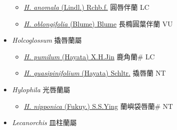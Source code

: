 \begin{itemize}
  \begin{itemize}
        \item[] \href{http://www.theplantlist.org/tpl1.1/search?q=Hetaeria+anomala}{\textit{H. anomala} (Lindl.) Rchb.f.}   圓唇伴蘭 LC
        \item[] \href{http://www.theplantlist.org/tpl1.1/search?q=Hetaeria+oblongifolia}{\textit{H. oblongifolia} (Blume) Blume}   長橢圓葉伴蘭 VU
  \end{itemize}
 \item[] \textit{Holcoglossum} 撬唇蘭屬
                    
  \begin{itemize}
        \item[] \href{http://www.theplantlist.org/tpl1.1/search?q=Holcoglossum+pumilum}{\textit{H. pumilum} (Hayata) X.H.Jin}     鹿角蘭\# LC
        \item[] \href{http://www.theplantlist.org/tpl1.1/search?q=Holcoglossum+quasipinifolium}{\textit{H. quasipinifolium} (Hayata) Schltr.}   撬唇蘭 NT
  \end{itemize}
 \item[] \textit{Hylophila} 光唇蘭屬
                    
  \begin{itemize}
        \item[] \href{http://www.theplantlist.org/tpl1.1/search?q=Hylophila+nipponica}{\textit{H. nipponica} (Fukuy.) S.S.Ying}   蘭嶼袋唇蘭\# NT
  \end{itemize}
 \item[] \textit{Lecanorchis} 皿柱蘭屬
                    

\end{itemize}

